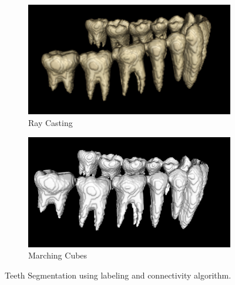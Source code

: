 \documentclass[12pt, b5paper]{article}
\begin{document}
\begin{figure}
    \centering
    \begin{subfigure}[b]{0.45\textwidth}
        \centering
        \includegraphics[width=\textwidth]{RCSO}
        \caption{Ray Casting}
    \end{subfigure}
    \hfill
    \begin{subfigure}[b]{0.45\textwidth}
        \centering
        \includegraphics[width=\textwidth]{MCSO}
        \caption{Marching Cubes}
    \end{subfigure}
    \caption{Teeth Segmentation using labeling and connectivity algorithm.}
    \label{fig:CL}
\end{figure}
\end{document}
